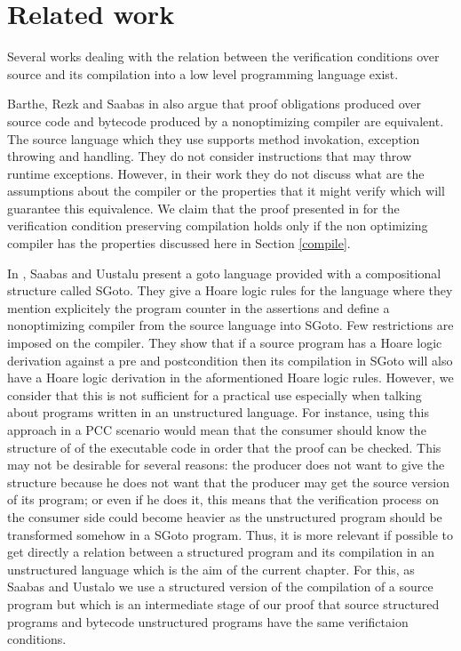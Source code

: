 \section{Related work}\label{pog:relWork}


Several works dealing with the relation between the 
verification conditions over source and its compilation into a low  level  programming  language exist.

Barthe, Rezk and Saabas in \cite{gta05:fast} also argue that proof obligations produced
over source code and
bytecode produced by a nonoptimizing compiler   are equivalent.
The source language which they use supports method invokation, exception throwing and handling. 
They do not consider instructions that may throw
runtime exceptions. 
 However, in their work they do not discuss  what are the  assumptions about the compiler 
or the  properties that it might verify  which will guarantee this equivalence.
 We claim that the proof presented in \cite{gta05:fast} for
 the verification condition preserving compilation holds only if the non optimizing 
 compiler has the properties discussed here in Section \ref{compile}.


In \cite{SU05CNS}, Saabas and Uustalu present a goto language provided with a compositional structure called SGoto.
They give a Hoare logic rules for the language where they mention explicitely the program counter in the assertions and define a nonoptimizing 
compiler from the source language into SGoto. Few  restrictions are imposed on the compiler. 
They show that if a source program has a Hoare logic derivation
 against a pre and postcondition then its compilation in SGoto will also have a Hoare
 logic derivation in the aformentioned Hoare logic rules. However, we consider that this is not sufficient for a practical use especially when 
talking about programs written in an unstructured language. 
For instance, using this approach in a PCC scenario would mean that the consumer should know the structure of 
of the  executable code in order that the proof can be checked. This may not be desirable for several reasons:
the producer does not want to  give the structure because he does not want that the producer may get the source version of its program; 
or even if he does it, this means that the verification process on the consumer side could become heavier as the unstructured program
 should be transformed somehow in a SGoto program.
 Thus, it is more relevant if possible to get directly  a relation between a structured program 
and its compilation in an  unstructured  language which is the aim of the current chapter.
 For this, as Saabas and Uustalo we use a  structured version of the compilation of a source program 
but which is an intermediate stage of our proof that source structured programs and bytecode unstructured 
programs have the same verifictaion conditions.

